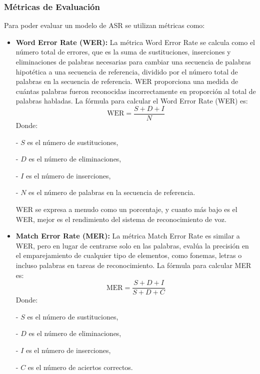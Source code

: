 \documentclass[conference]{IEEEtran}
\begin{document}
\subsubsection{Métricas de Evaluación}
Para poder evaluar un modelo de ASR se utilizan métricas como:
\begin{itemize}
    \item \textbf{Word Error Rate (WER):} La métrica Word Error Rate se calcula como el número total de errores, que es la suma de sustituciones, inserciones y eliminaciones de palabras necesarias para cambiar una secuencia de palabras hipotética a una secuencia de referencia, dividido por el número total de palabras en la secuencia de referencia. WER proporciona una medida de cuántas palabras fueron reconocidas incorrectamente en proporción al total de palabras habladas.
    La fórmula para calcular el Word Error Rate (WER) es:
    \begin{equation}
        \text{WER} = \frac{S + D + I}{N}
    \end{equation}
    Donde:
    
    - \( S \) es el número de sustituciones,
    
    - \( D \) es el número de eliminaciones,
    
    - \( I \) es el número de inserciones,
    
    - \( N \) es el número de palabras en la secuencia de referencia.
    
    WER se expresa a menudo como un porcentaje, y cuanto más bajo es el WER, mejor es el rendimiento del sistema de reconocimiento de voz.
    
    \item \textbf{ Match Error Rate (MER):} La métrica Match Error Rate es similar a WER, pero en lugar de centrarse solo en las palabras, evalúa la precisión en el emparejamiento de cualquier tipo de elementos, como fonemas, letras o incluso palabras en tareas de reconocimiento. La fórmula para calcular MER es:
    \begin{equation}
        \text{MER} = \frac{S + D + I}{S + D + C}
    \end{equation}
    Donde:
    
    - \( S \) es el número de sustituciones,
    
    - \( D \) es el número de eliminaciones,
    
    - \( I \) es el número de inserciones,
    
    - \( C \) es el número de aciertos correctos.
    

\end{itemize}
\end{document}
